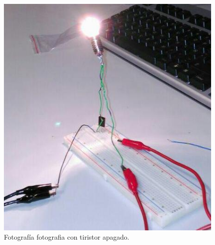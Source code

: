 \documentclass[paper=a4, fontsize=11pt]{scrartcl} %
\numberwithin{equation}{section} %
\numberwithin{figure}{section} %
\numberwithin{table}{section} %
\begin{document}
\begin{figure}[H]
	\centering
	\includegraphics[scale=0.7]{image/practica1-bombillaB}
	\caption{Fotografía fotografia con tiristor apagado.} \label{Color-resistencia}
\end{figure}


\vspace*{13cm}

\end{document}
